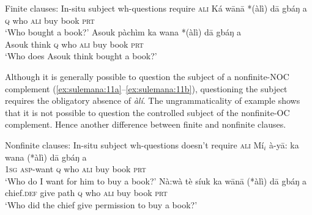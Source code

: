 \documentclass[output=paper,colorlinks,citecolor=brown]{langscibook}
\begin{document}
\ea%
    \label{ex:sulemana:10} 
    Finite clauses: In-situ subject wh-questions require \textsc{ali}
    \ea%
    \label{ex:sulemana:10a}
    \gll    Ká wānā *(àlì) dā gbáŋ a\\
            \textsc{q} who \textsc{ali} buy book \textsc{prt} \\
    \glt    `Who bought a book?' 
    \ex%
    \gll    Asouk pàchìm ka wana  *(àlì) dā gbáŋ a\\
            Asouk think \textsc{q} who \textsc{ali}  buy book \textsc{prt} \\
    \glt    `Who does Asouk think bought  a book?' 
    \z
\z

Although it is generally possible to question the subject of a nonfinite-NOC complement (\ref{ex:sulemana:11a}--\ref{ex:sulemana:11b}), questioning the subject requires the obligatory absence of {\it{àlí}}. 
The ungrammaticality of example  shows that it is not possible to question the controlled subject of the nonfinite-OC complement. Hence another difference between finite and nonfinite clauses. %

\ea%
    \label{ex:sulemana:11} 
    Nonfinite clauses: In-situ subject wh-questions doesn't require \textsc{ali}
    \ea%
    \label{ex:sulemana:11a}
    \gll    Mí$_i$ à-yā: ka wana (*àlì) dā gbáŋ a \\
            \textsc{1sg} \textsc{asp}-want \textsc{q} who  \textsc{ali}  buy book \textsc{prt}  \\
    \glt    `Who do I want for him to buy a book?' 
    \ex%
    \label{ex:sulemana:11b}
    \gll    Nà:wà tè síuk  ka wānā (*àlì) dā gbáŋ a \\
            chief.\textsc{def} give path \textsc{q} who  \textsc{ali} buy book \textsc{prt} \\
    \glt    `Who did the chief give permission to buy a book?' 
    \z
\z
\end{document}
